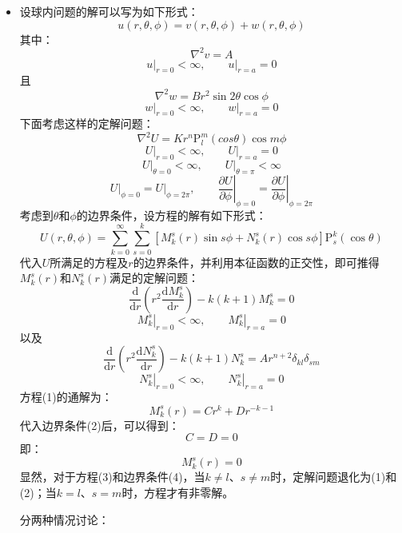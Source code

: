 \documentclass[fontset=windows]{ctexart}
\begin{document}
\begin{itemize}
    \item[12.]
    设球内问题的解可以写为如下形式：
    \[
    u(r,\theta,\phi) = v(r,\theta,\phi) + w(r,\theta,\phi)
    \]
    其中：
    \[
    \nabla^2 v = A
    \]
    \[
    \left.u\right|_{r=0} < \infty,\qquad \left.u\right|_{r=a} = 0
    \]
    且
    \[
    \nabla^2 w = Br^2\sin{2\theta}\cos\phi
    \]
    \[
    \left.w\right|_{r=0} < \infty,\qquad \left.w\right|_{r=a} = 0
    \]
    下面考虑这样的定解问题：
    \[
    \nabla^2 U = Kr^n \mathrm{P}_l^m(cos\theta)\cos{m\phi}
    \]
    \[
    \left.U\right|_{r=0} < \infty,\qquad \left.U\right|_{r=a} = 0
    \]
    \[
    \left.U\right|_{\theta=0} < \infty,\qquad \left.U\right|_{\theta=\pi} < \infty
    \]
    \[
    \left.U\right|_{\phi=0} = \left.U\right|_{\phi=2\pi},\qquad \left.\frac{\partial U}{\partial\phi}\right|_{\phi=0} = \left.\frac{\partial U}{\partial\phi}\right|_{\phi=2\pi}
    \]
    考虑到$\theta$和$\phi$的边界条件，设方程的解有如下形式：
    \[
    U(r,\theta,\phi) = \sum_{k=0}^{\infty}\sum_{s=0}^{k}\left[M_k^s(r)\sin{s\phi} + N_k^s(r)\cos{s\phi}\right]\mathrm{P}_s^k(\cos\theta)
    \]
    代入$U$所满足的方程及$r$的边界条件，并利用本征函数的正交性，即可推得$M_k^s(r)$和$N_k^s(r)$满足的定解问题：
    \[
    \frac{\mathrm{d}}{\mathrm{d}r}\left(r^2\frac{\mathrm{d}M_k^s}{\mathrm{d}r}\right) - k(k+1)M_k^s = 0 \tag{1}
    \]
    \[
    \left.M_k^s\right|_{r=0} < \infty,\qquad \left.M_k^s\right|_{r=a} = 0 \tag{2}
    \]
    以及
    \[
    \frac{\mathrm{d}}{\mathrm{d}r}\left(r^2\frac{\mathrm{d}N_k^s}{\mathrm{d}r}\right) - k(k+1)N_k^s = Ar^{n+2}\delta_{kl}\delta_{sm} \tag{3}
    \]
    \[
    \left.N_k^s\right|_{r=0} < \infty,\qquad \left.N_k^s\right|_{r=a} = 0 \tag{4}
    \]
    方程(1)的通解为：
    \[
    M_k^s(r) = Cr^k + Dr^{-k-1}
    \]
    代入边界条件(2)后，可以得到：
    \[
    C = D = 0
    \]
    即：
    \[
    M_k^s(r) = 0
    \]
    显然，对于方程(3)和边界条件(4)，当$k \neq l$、$s \neq m$时，定解问题退化为(1)和(2)；当$k=l$、$s=m$时，方程才有非零解。

    分两种情况讨论：


\end{itemize}
\end{document}
